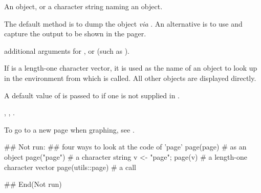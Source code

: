 %
\begin{Arguments}
\begin{ldescription}
\item[\code{x}] An \R{} object, or a character string naming an object.
\item[\code{method}] The default method is to dump the object \emph{via}
.  An alternative is to use  and
capture the output to be shown in the pager.
\item[\code{...}] additional arguments for ,
 or  (such as ).
\end{ldescription}
\end{Arguments}
%
\begin{Details}\relax
If  is a length-one character vector, it is used as the name
of an object to look up in the environment from which  is
called.   All other objects are displayed directly.

A default value of  is passed to  if one
is not supplied in .
\end{Details}
%
\begin{SeeAlso}\relax
{}, , .

To go to a new page when graphing, see .
\end{SeeAlso}
%
\begin{Examples}
\begin{ExampleCode}
## Not run: ## four ways to look at the code of 'page'
page(page)             # as an object
page("page")           # a character string
v <- "page"; page(v)   # a length-one character vector
page(utils::page)      # a call

## End(Not run)
\end{ExampleCode}
\end{Examples}
